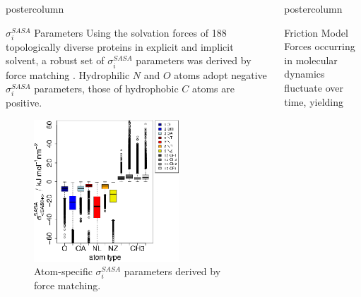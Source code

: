 \documentclass{beamer}
\newcommand{\sig}{$\sigma_i^{SASA}$}
\newlength{\columnheight}
\begin{document}
\begin{frame}
\begin{columns}
\begin{column}{.45\textwidth}
\begin{beamercolorbox}[center]{postercolumn}
\begin{minipage}{.98\textwidth}
{\begin{myblock}{\sig{} Parameters}
Using the solvation forces of 188 topologically diverse proteins in explicit
and implicit solvent, a robust set of \sig{} parameters was derived by
force matching \cite{Fraternali:1996p939,Kleinjung_2012a}.
Hydrophilic $N$ and $O$ atoms adopt negative \sig{} parameters,
those of hydrophobic $C$ atoms are positive.
\vspace{2cm}
\begin{figure}
\begin{minipage}{1.0\textwidth}
\centering\includegraphics[width=0.7\textwidth]{./sigma.all.atomtype.box.sided.eps}
\caption{Atom-specific \sig{} parameters derived by force matching.}
\label{fig:projection}
\end{minipage}
\end{figure}
\end{myblock}\vfill
}\end{minipage}
\end{beamercolorbox}
\end{column}
\begin{column}{.45\textwidth}
\begin{beamercolorbox}[center]{postercolumn}
\begin{minipage}{.98\textwidth}  %
\parbox[t][\columnheight]{\textwidth}{ %
\begin{myblock}{Friction Model}
Forces occurring in molecular dynamics fluctuate over time, yielding

\end{myblock}}
\end{minipage}
\end{beamercolorbox}
\end{column}
\end{columns}
\end{frame}
\end{document}
